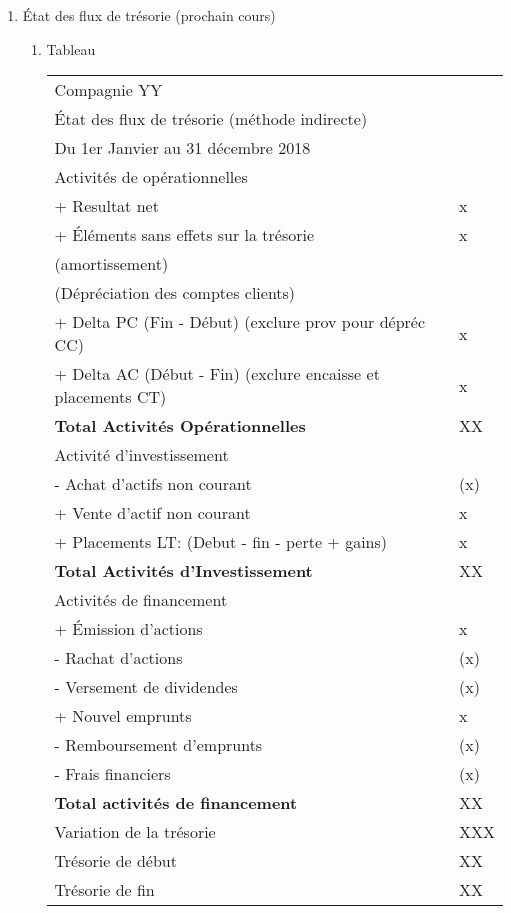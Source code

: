 \documentclass[11pt]{article}
\begin{document}
\begin{enumerate}
\item État des flux de trésorie (prochain cours)
\label{sec:org34edff1}
\begin{enumerate}
\item Tableau
\label{sec:org8e1fa2f}
\begin{center}
\begin{tabular}{ll}
\hline
Compagnie YY & \\
État des flux de trésorie (méthode indirecte) & \\
Du 1er Janvier au 31 décembre 2018 & \\
\hline
Activités de opérationnelles & \\
\hline
+ Resultat net & x\\
+ Éléments sans effets sur la trésorie & x\\
(amortissement) & \\
(Dépréciation des comptes clients) & \\
+ Delta PC (Fin - Début) (exclure prov pour dépréc CC) & x\\
+ Delta AC (Début - Fin) (exclure encaisse et placements CT) & x\\
\hline
\textbf{Total Activités Opérationnelles} & XX\\
\hline
Activité d'investissement & \\
\hline
- Achat d'actifs non courant & (x)\\
+ Vente d'actif non courant & x\\
+ Placements LT: (Debut - fin - perte + gains) & x\\
\hline
\textbf{Total Activités d'Investissement} & XX\\
\hline
Activités de financement & \\
\hline
+ Émission d'actions & x\\
- Rachat d'actions & (x)\\
- Versement de dividendes & (x)\\
+ Nouvel emprunts & x\\
- Remboursement d'emprunts & (x)\\
- Frais financiers & (x)\\
\hline
\textbf{Total activités de financement} & XX\\
\hline
Variation de la trésorie & XXX\\
Trésorie de début & XX\\
Trésorie de fin & XX\\
\hline
\end{tabular}
\end{center}


\end{enumerate}
\end{enumerate}
\end{document}
